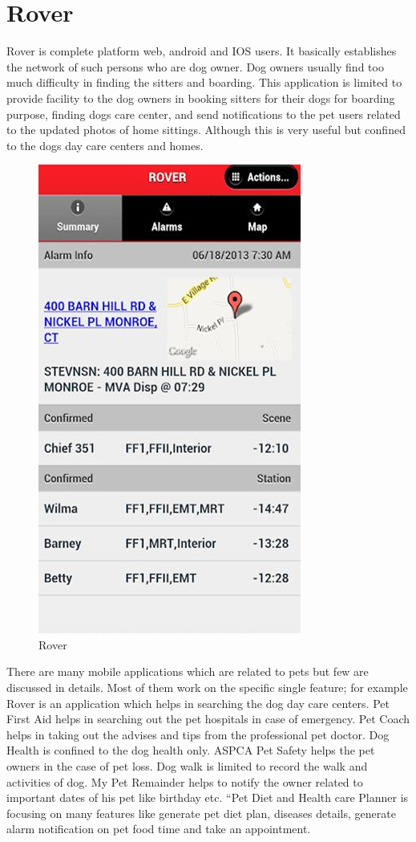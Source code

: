 \section{Rover\cite{capsrover}}
Rover is complete platform web, android and IOS users.  It basically establishes the network of such persons who are dog owner. Dog owners usually find too much difficulty in finding the sitters and boarding. This application is limited to provide facility to the dog owners in booking sitters for their dogs for boarding purpose, finding dogs care center, and send notifications to the pet users related to the updated photos of home sittings. Although this is very useful but confined to the dogs day care centers and homes. 
\begin{figure}[H]
  \centering
    \includegraphics[scale=0.3]{28rover}
      \caption{Rover}
\end{figure}
There are many mobile applications which are related to pets but few are discussed in details. Most of them work on the specific single feature; for example Rover is an application which helps in searching the dog day care centers. Pet First Aid helps in searching out the pet hospitals in case of emergency. Pet Coach helps in taking out the advises and tips from the professional pet doctor. Dog Health is confined to the dog health only. ASPCA Pet Safety helps the pet owners in the case of pet loss. Dog walk is limited to record the walk and activities of dog. My Pet Remainder helps to notify the owner related to important dates of his pet like birthday etc. “Pet Diet and Health care Planner is focusing on many features like generate pet diet plan, diseases details, generate alarm  notification on pet food time and take an appointment.








